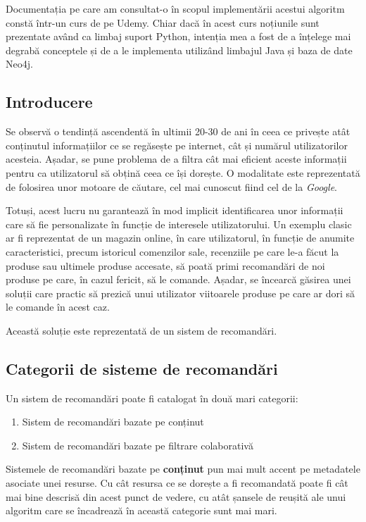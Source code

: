 \documentclass[12pt,a4paper]{report}
\begin{document}
Documentația pe care am consultat-o în scopul implementării acestui algoritm constă într-un curs de pe Udemy. \cite{27} Chiar dacă în acest curs noțiunile sunt prezentate având ca limbaj suport Python, intenția mea a fost de a înțelege mai degrabă conceptele și de a le implementa utilizând limbajul Java și baza de date Neo4j.

\subsection{Introducere}

Se observă o tendință ascendentă în ultimii 20-30 de ani în ceea ce privește atât conținutul informațiilor ce se regăsește pe internet, cât și numărul utilizatorilor acesteia. \cite{28} Așadar, se pune problema de a filtra cât mai eficient aceste informații pentru ca utilizatorul să obțină ceea ce își dorește. O modalitate este reprezentată de folosirea unor motoare de căutare, cel mai cunoscut fiind cel de la \emph{Google}. \cite{5}

Totuși, acest lucru nu garantează în mod implicit identificarea unor informații care să fie personalizate în funcție de interesele utilizatorului. Un exemplu clasic ar fi reprezentat de un magazin online, în care utilizatorul, în funcție de anumite caracteristici, precum istoricul comenzilor sale, recenziile pe care le-a făcut la produse sau ultimele produse accesate, să poată primi recomandări de noi produse pe care, în cazul fericit, să le comande. Așadar, se încearcă găsirea unei soluții care practic să prezică unui utilizator viitoarele produse pe care ar dori să le comande în acest caz.

Această soluție este reprezentată de un sistem de recomandări.

\subsection{Categorii de sisteme de recomandări}

Un sistem de recomandări poate fi catalogat în două mari categorii:

\begin{enumerate}
  \item Sistem de recomandări bazate pe conținut
  \item Sistem de recomandări bazate pe filtrare colaborativă
\end{enumerate}

Sistemele de recomandări bazate pe \textbf{conținut} pun mai mult accent pe metadatele asociate unei resurse. Cu cât resursa ce se dorește a fi recomandată poate fi cât mai bine descrisă din acest punct de vedere, cu atât șansele de reușită ale unui algoritm care se încadrează în această categorie sunt mai mari. 
\end{document}
